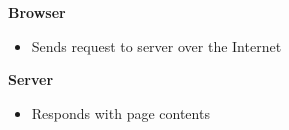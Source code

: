 \documentclass[9pt]{extarticle}
\begin{document}
\begin{multicols*}{3}
\textbf{Browser}
\begin{itemize}
    \item Sends request to server over the Internet
\end{itemize}

\textbf{Server}
\begin{itemize}
    \item Responds with page contents
\end{itemize}




\end{multicols*}
\end{document}
